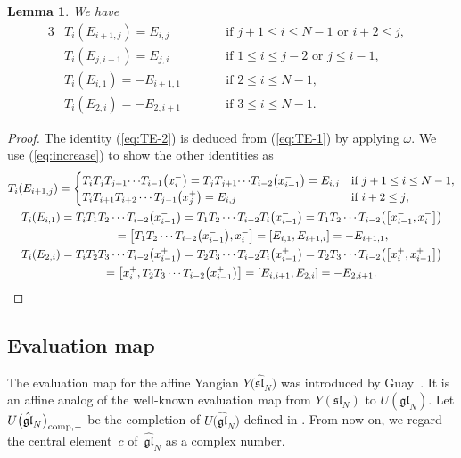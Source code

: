 \documentclass[10pt,a4paper]{amsart}
\newtheorem{lem}[thm]{Lemma}
\theoremstyle{definition}
\numberwithin{equation}{section}
\newcommand{\affY}{Y\big(\affsl\big)}
\newcommand{\gl}{\mathfrak{gl}}
\newcommand{\fraksl}{\mathfrak{sl}}
\newcommand{\affsl}{\hat{\mathfrak{sl}}_N}
\begin{document}
\begin{lem}We have
\begin{alignat}{3}
&T_i(E_{i+1,j})= E_{i,j} \qquad && \text{if $j+1 \leq i \leq N-1$ \ or \ $i+2 \leq j$}, & \label{eq:TE-1}\\
&T_i(E_{j,i+1})= E_{j,i} \qquad &&\text{if $1 \leq i \leq j-2$ \ or \ $j \leq i-1$}, & \label{eq:TE-2}\\
&T_i(E_{i,1})= -E_{i+1,1} \qquad &&\text{if $2 \leq i \leq N-1$}, & \label{eq:TE-3}\\
&T_i(E_{2,i})= -E_{2,i+1} \qquad &&\text{if $3 \leq i \leq N-1$}. & \label{eq:TE-4}
\end{alignat}
\end{lem}
\begin{proof}The identity (\ref{eq:TE-2}) is deduced from (\ref{eq:TE-1}) by applying $\omega$. We use (\ref{eq:increase}) to show the other identities as
\begin{gather*}
T_i(E_{i+1,j}) = \begin{cases}
T_i T_j T_{j+1} {\cdots} T_{i-1}\big(x_i^-\big) = T_j T_{j+1} {\cdots} T_{i-2} \big(x_{i-1}^-\big) = E_{i,j} &\text{if $j+1 \leq i \leq N-1$}, \\
T_i T_{i+1} T_{i+2} \cdots T_{j-1}\big(x_j^+\big) = E_{i,j} & \text{if $i+2 \leq j$},
\end{cases}
\\
T_i(E_{i,1}) = T_i T_{1} T_{2} \cdots T_{i-2}\big(x_{i-1}^-\big) = T_{1} T_{2} \cdots T_{i-2} T_i \big(x_{i-1}^-\big)= T_{1} T_{2} \cdots T_{i-2} \big(\big[x_{i-1}^-,x_i^-\big]\big)\\
\hphantom{T_i(E_{i,1})}{} = \big[T_{1} T_{2} \cdots T_{i-2} \big(x_{i-1}^-\big),x_i^-\big] = [E_{i,1}, E_{i+1,i}] = -E_{i+1,1},\\
T_i(E_{2,i}) = T_i T_{2} T_{3} \cdots T_{i-2}\big(x_{i-1}^+\big) = T_{2} T_{3} \cdots T_{i-2} T_i \big(x_{i-1}^+\big) = T_{2} T_{3} \cdots T_{i-2} \big(\big[x_{i}^+,x_{i-1}^+\big]\big)\\
\hphantom{T_i(E_{2,i})}{} = \big[x_i^+, T_{2} T_{3} \cdots T_{i-2} \big(x_{i-1}^+\big)\big] = [E_{i,i+1}, E_{2,i}] = -E_{2,i+1}.\tag*{\qed}
\end{gather*}\renewcommand{\qed}{}
\end{proof}

\subsection{Evaluation map}

The evaluation map for the affine Yangian $\affY$ was introduced by Guay~\cite{MR2323534}. It is an affine analog of the well-known evaluation map from $Y(\fraksl_N)$ to $U(\gl_N)$. Let $U\big(\hat{\gl}_N\big)_{{\rm comp},-}$ be the completion of ${U}\big(\hat{\gl}_N\big)$ defined in \cite[Definition~2.5]{kodera_evaluation}. From now on, we regard the central element~$c$ of~$\hat{\gl}_N$ as a complex number.
\end{document}
